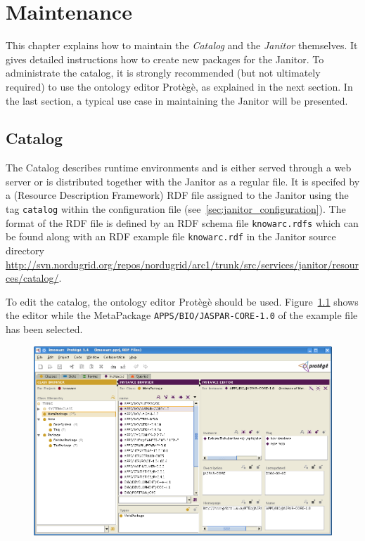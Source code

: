 \chapter{Maintenance}

This chapter explains how to maintain the {\em Catalog} and the {\em Janitor}
themselves.
It gives detailed instructions how to create new packages for the
Janitor.
To administrate the catalog, it is strongly recommended
(but not ultimately required) to use the ontology editor Prot\`eg\`e,
as explained in the next section.
In the last section, a typical use case in maintaining the Janitor will
be presented.


\section{Catalog}\label{sec:catalog}

The Catalog describes runtime environments and is either served
through a web server or is distributed together with the Janitor as a
regular file.
It is specifed by a (Resource Description Framework) RDF file
assigned to the Janitor using the tag \texttt{catalog} within
the configuration file (see~\ref{sec:janitor_configuration}).
The format of the RDF file is defined by an RDF schema file
\texttt{knowarc.rdfs} which can be found along with an RDF
example file \texttt{knowarc.rdf} in the Janitor source directory
\href{http://svn.nordugrid.org/repos/nordugrid/arc1/trunk/src/services/janitor/resources/catalog/}
{http://svn.nordugrid.org/repos/nordugrid/arc1/trunk/src/services/janitor/resources/catalog/}.

To edit the catalog, the ontology editor Prot\`eg\`e should be
used. Figure~\ref{fig:protege_example} shows the editor while the
MetaPackage \texttt{APPS/BIO/JASPAR-CORE-1.0} of the example file has
been selected.

\begin{figure}
  \begin{center}
    \includegraphics[width=\textwidth]{images/protege_JASPAR.png}
    \label{fig:protege_example}
  \end{center}
\end{figure}

